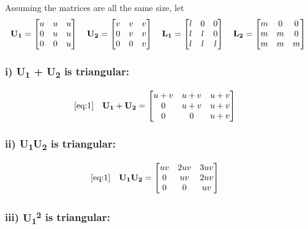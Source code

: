 \documentclass{article}
\begin{document}
\def \Lonematrix {
\begin{bmatrix}
l & 0 & 0\\
l & l & 0\\
l & l & l
\end{bmatrix}
}
\def \Ltwomatrix {
\begin{bmatrix}
m & 0 & 0\\
m & m & 0\\
m & m & m
\end{bmatrix}
}

Assuming the matrices are all the same size, let
\begin{align}
    \label{eq:1}
    \textbf{U\textsubscript{1}} = \Uonematrix{} &&
    \textbf{U\textsubscript{2}} = \Utwomatrix{} &&
    \textbf{L\textsubscript{1}} = \Lonematrix{} &&
    \textbf{L\textsubscript{2}} = \Ltwomatrix{}
\end{align}

\subsubsection*{i) \textbf{U\textsubscript{1}} + \textbf{U\textsubscript{2}} is triangular:} 

\begin{align}
    \label{eq:2}
    \eqref{eq:1} &&
    \textbf{U\textsubscript{1}} + \textbf{U\textsubscript{2}} &=
    \begin{bmatrix}
    u+v & u+v & u+v\\
    0 & u+v & u+v\\
    0 & 0 & u+v
    \end{bmatrix}
\end{align}

\subsubsection*{ii) \textbf{U\textsubscript{1}}\textbf{U\textsubscript{2}} is triangular:}

\begin{align}
    \label{eq:3}
    \eqref{eq:1} &&
    \textbf{U\textsubscript{1}}\textbf{U\textsubscript{2}} &=
    \begin{bmatrix}
    uv & 2uv & 3uv\\
    0 & uv & 2uv\\
    0 & 0 & uv
    \end{bmatrix}
\end{align}

\subsubsection*{iii) \textbf{U\textsubscript{1}\textsuperscript{2}} is triangular:}
\end{document}
